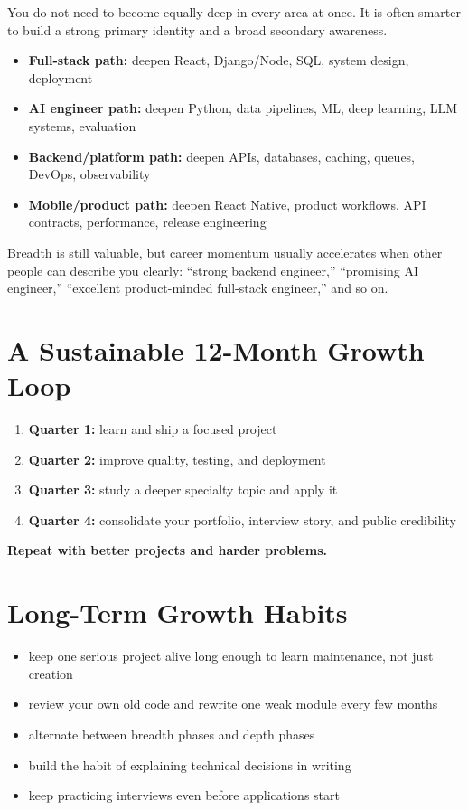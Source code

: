 \documentclass[12pt, a4paper, oneside]{book}
\begin{document}
You do not need to become equally deep in every area at once. It is often smarter to build a strong primary identity and a broad secondary awareness.

\begin{itemize}[leftmargin=2em]
    \item \textbf{Full-stack path:} deepen React, Django/Node, SQL, system design, deployment
    \item \textbf{AI engineer path:} deepen Python, data pipelines, ML, deep learning, LLM systems, evaluation
    \item \textbf{Backend/platform path:} deepen APIs, databases, caching, queues, DevOps, observability
    \item \textbf{Mobile/product path:} deepen React Native, product workflows, API contracts, performance, release engineering
\end{itemize}

\begin{notebox}
Breadth is still valuable, but career momentum usually accelerates when other people can describe you clearly: ``strong backend engineer,'' ``promising AI engineer,'' ``excellent product-minded full-stack engineer,'' and so on.
\end{notebox}

\section{A Sustainable 12-Month Growth Loop}

\begin{enumerate}[leftmargin=2em]
    \item \textbf{Quarter 1:} learn and ship a focused project
    \item \textbf{Quarter 2:} improve quality, testing, and deployment
    \item \textbf{Quarter 3:} study a deeper specialty topic and apply it
    \item \textbf{Quarter 4:} consolidate your portfolio, interview story, and public credibility
\end{enumerate}

\textbf{Repeat with better projects and harder problems.}

\section{Long-Term Growth Habits}

\begin{itemize}[leftmargin=2em]
    \item keep one serious project alive long enough to learn maintenance, not just creation
    \item review your own old code and rewrite one weak module every few months
    \item alternate between breadth phases and depth phases
    \item build the habit of explaining technical decisions in writing
    \item keep practicing interviews even before applications start
\end{itemize}
\end{document}
